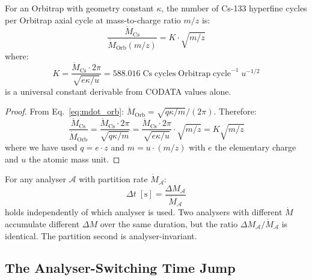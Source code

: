 \begin{theorem}
\label{thm:K}
For an Orbitrap with geometry constant $\kappa$, the number of Cs-133 hyperfine
cycles per Orbitrap axial cycle at mass-to-charge ratio $m/z$ is:
\begin{equation}
    \frac{\dot{M}_{\mathrm{Cs}}}{\dot{M}_{\mathrm{Orb}}(m/z)} = K \cdot
    \sqrt{m/z}
    \label{eq:K_conversion}
\end{equation}
where:
\begin{equation}
    K = \frac{\dot{M}_{\mathrm{Cs}} \cdot 2\pi}{\sqrt{e\kappa/u}}
    = 588.016 \;\mathrm{Cs\;cycles\;Orbitrap\;cycle}^{-1}\;u^{-1/2}
    \label{eq:K_value}
\end{equation}
is a universal constant derivable from CODATA values alone.
\end{theorem}

\begin{proof}
From Eq.~\eqref{eq:mdot_orb}: $\dot{M}_{\mathrm{Orb}} = \sqrt{q\kappa/m}/(2\pi)$.
Therefore:
\begin{equation}
    \frac{\dot{M}_{\mathrm{Cs}}}{\dot{M}_{\mathrm{Orb}}} =
    \frac{\dot{M}_{\mathrm{Cs}} \cdot 2\pi}{\sqrt{q\kappa/m}} =
    \frac{\dot{M}_{\mathrm{Cs}} \cdot 2\pi}{\sqrt{e\kappa/u}} \cdot \sqrt{m/z}
    = K\sqrt{m/z}
\end{equation}
where we have used $q = e \cdot z$ and $m = u \cdot (m/z)$ with $e$ the
elementary charge and $u$ the atomic mass unit.
\end{proof}

\begin{corollary}
\label{cor:analyser_independent}
For any analyser $\mathcal{A}$ with partition rate $\dot{M}_{\mathcal{A}}$:
\begin{equation}
    \Delta t \;[\mathrm{s}] = \frac{\Delta M_{\mathcal{A}}}{\dot{M}_{\mathcal{A}}}
    \label{eq:analyser_independent}
\end{equation}
holds independently of which analyser is used. Two analysers with different
$\dot{M}$ accumulate different $\Delta M$ over the same duration, but the ratio
$\Delta M_{\mathcal{A}}/\dot{M}_{\mathcal{A}}$ is identical. The partition
second is analyser-invariant.
\end{corollary}

\subsection{The Analyser-Switching Time Jump}
\label{subsec:time_jump}

